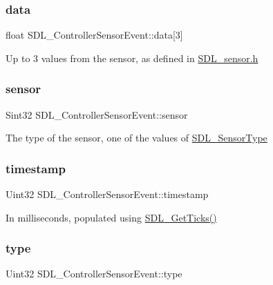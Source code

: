 \subsubsection{\texorpdfstring{data}{data}}
{\footnotesize\ttfamily float S\+D\+L\+\_\+\+Controller\+Sensor\+Event\+::data\mbox{[}3\mbox{]}}

Up to 3 values from the sensor, as defined in \mbox{\hyperlink{_s_d_l__sensor_8h}{S\+D\+L\+\_\+sensor.\+h}} \mbox{\label{struct_s_d_l___controller_sensor_event_aac19e4034212a30d64066a122d5db2a8}} 
\subsubsection{\texorpdfstring{sensor}{sensor}}
{\footnotesize\ttfamily Sint32 S\+D\+L\+\_\+\+Controller\+Sensor\+Event\+::sensor}

The type of the sensor, one of the values of \mbox{\hyperlink{_s_d_l__sensor_8h_a94a441696f7d053dd541ec0b7e00e33a}{S\+D\+L\+\_\+\+Sensor\+Type}} \mbox{\label{struct_s_d_l___controller_sensor_event_a67f4b70a91f347130928f1c91d120e95}} 
\subsubsection{\texorpdfstring{timestamp}{timestamp}}
{\footnotesize\ttfamily Uint32 S\+D\+L\+\_\+\+Controller\+Sensor\+Event\+::timestamp}

In milliseconds, populated using \mbox{\hyperlink{_s_d_l__timer_8h_a0b9bc71d6287e0ffafdc3419760fe2b3}{S\+D\+L\+\_\+\+Get\+Ticks()}} \mbox{\label{struct_s_d_l___controller_sensor_event_a553d55d13d9b118679a3f208c41e96cb}} 
\subsubsection{\texorpdfstring{type}{type}}
{\footnotesize\ttfamily Uint32 S\+D\+L\+\_\+\+Controller\+Sensor\+Event\+::type}

